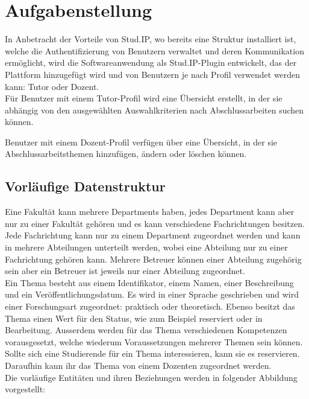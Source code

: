 \section{Aufgabenstellung}
In Anbetracht der Vorteile von Stud.IP, wo bereits eine Struktur installiert ist, welche die Authentifizierung von Benutzern verwaltet und deren Kommunikation ermöglicht, wird die Softwareanwendung als Stud.IP-Plugin entwickelt, das der Plattform hinzugefügt wird und von Benutzern je nach Profil verwendet werden kann: Tutor oder Dozent.\\

Für Benutzer mit einem Tutor-Profil wird eine Übersicht erstellt, in der sie abhängig von den ausgewählten Auswahlkriterien nach Abschlussarbeiten suchen können.

Benutzer mit einem Dozent-Profil verfügen über eine Übersicht, in der sie Abschlussarbeitsthemen hinzufügen, ändern oder löschen können.

\subsection{Vorläufige Datenstruktur}
Eine Fakultät kann mehrere Departments haben, jedes Department kann aber nur zu einer Fakultät gehören und es kann verschiedene Fachrichtungen besitzen.
Jede Fachrichtung kann nur zu einem Department zugeordnet werden und kann in mehrere Abteilungen unterteilt werden, wobei eine Abteilung nur zu einer Fachrichtung gehören kann.
Mehrere Betreuer können einer Abteilung zugehörig sein aber ein Betreuer ist jeweils nur einer Abteilung zugeordnet.\\

Ein Thema besteht aus einem Identifikator, einem Namen, einer Beschreibung und ein Veröffentlichungsdatum. Es wird in einer Sprache geschrieben und wird einer Forschungsart zugeordnet: praktisch oder theoretisch. Ebenso besitzt das Thema einen Wert für den Status, wie zum Beispiel reserviert oder in Bearbeitung. Au{ss}erdem werden für das Thema verschiedenen Kompetenzen vorausgesetzt, welche wiederum Voraussetzungen mehrerer Themen sein können.\\
Sollte sich eine Studierende für ein Thema interessieren, kann sie es reservieren. Daraufhin kann ihr das Thema von einem Dozenten zugeordnet werden.\\

Die vorläufige Entitäten und ihren Beziehungen werden in folgender Abbildung vorgestellt:\\


